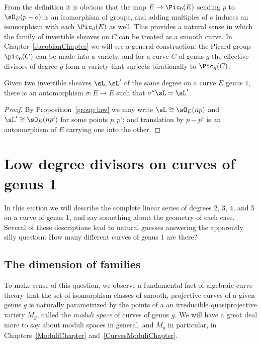\begin{remark}
From the definition it is obvious that
the map
$E \to \Pic_0(E)$ sending $p$ to $\sO_E(p-o)$ is an isomorphism of groups, and adding multiples of $o$
induces an isomorphism with each $\Pic_d(E)$ as well. This provides a natural sense
in which the family of invertible sheaves on $C$ can be treated as a smooth curve.
 In Chapter~\ref{JacobianChapter} we will see a general construction:
 the
Picard group
%
$\pic_0(C)$ can be made into
a variety, and for a curve $C$ of genus $g$ the effective divisors
of degree $g$ form a variety that surjects birationally to $\Pic_g(C)$.
\end{remark}


\begin{corollary}\label{equivalence of sheaves}
Given two invertible sheaves $\sL, \sL'$ of the same degree on a curve
%
$E$ genus $1$, there is an automorphism $\sigma: E\to E$
such that $\sigma^*\sL = \sL'$.
\end{corollary}

\begin{proof}
By Proposition~\ref{group law} we may write $\sL \cong \sO_E(np)$ and $\sL'\cong \sO_E(np')$ for some points $p,p'$; and translation by $p-p'$
is an automorphism of $E$ carrying one into the other.
\end{proof}


\section{Low degree divisors on curves of genus 1}

In this section we will describe the complete linear series of degrees
2, 3, 4, and 5 on a curve of genus 1, and say something
about the geometry of each case. Several of these descriptions lead to natural guesses answering the
apparently silly question: How many different curves of genus 1 are there?

\subsection*{The dimension of families}

To make sense of this question, we observe a fundamental fact of
algebraic curve theory that the set of isomorphism classes of smooth,
projective curves of a given genus $g$ is naturally parametrized by
the points of a
%
%
%
an irreducible
quasiprojective variety
$M_g$, called the \emph{moduli space} of curves of genus $g$. We will
have a great deal more to say about moduli spaces in general, and
$M_g$ in particular, in Chapters~\ref{ModuliChapter}
and~\ref{CurvesModuliChapter}.

